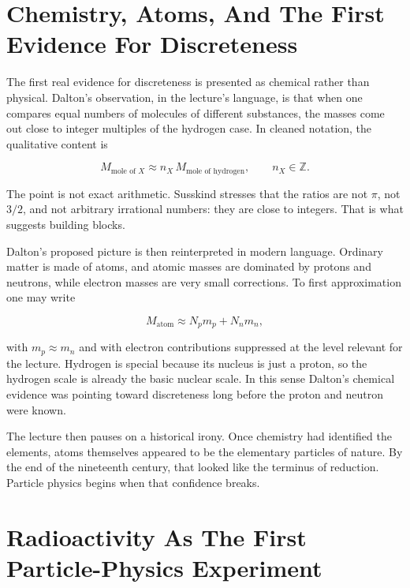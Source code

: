 \section{Chemistry, Atoms, And The First Evidence For Discreteness}

The first real evidence for discreteness is presented as chemical rather than physical. Dalton's observation, in the lecture's language, is that when one compares equal numbers of molecules of different substances, the masses come out close to integer multiples of the hydrogen case. In cleaned notation, the qualitative content is

\begin{equation}
M_{\text{mole of }X} \approx n_X\, M_{\text{mole of hydrogen}},
\qquad n_X \in \mathbb{Z}.
\end{equation}

The point is not exact arithmetic. Susskind stresses that the ratios are not \(\pi\), not \(3/2\), and not arbitrary irrational numbers: they are close to integers. That is what suggests building blocks.

Dalton's proposed picture is then reinterpreted in modern language. Ordinary matter is made of atoms, and atomic masses are dominated by protons and neutrons, while electron masses are very small corrections. To first approximation one may write

\begin{equation}
M_{\text{atom}} \approx N_p m_p + N_n m_n,
\end{equation}

with \(m_p \approx m_n\) and with electron contributions suppressed at the level relevant for the lecture. Hydrogen is special because its nucleus is just a proton, so the hydrogen scale is already the basic nuclear scale. In this sense Dalton's chemical evidence was pointing toward discreteness long before the proton and neutron were known.

The lecture then pauses on a historical irony. Once chemistry had identified the elements, atoms themselves appeared to be the elementary particles of nature. By the end of the nineteenth century, that looked like the terminus of reduction. Particle physics begins when that confidence breaks.

\section{Radioactivity As The First Particle-Physics Experiment}

